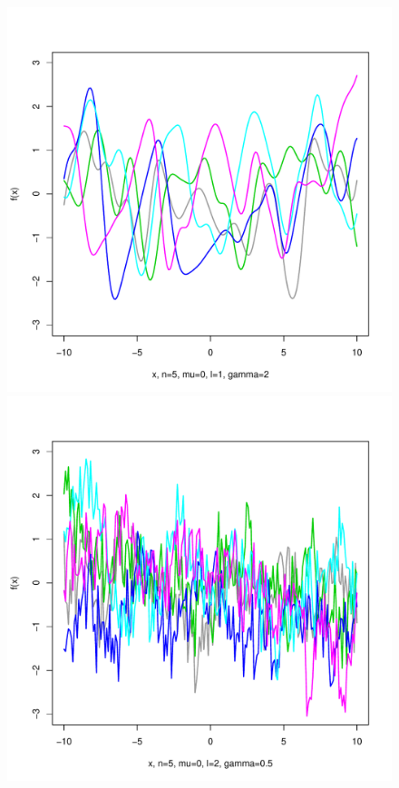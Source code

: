 \documentclass[12pt,letterpaper]{article}
\begin{document}
\begin{figure}
\begin{center}
\includegraphics[scale=0.2]{hw321/n5-m0-l1-g4.pdf}
\includegraphics[scale=0.2]{hw321/n5-m0-l2-g1.pdf}

\end{center}
\end{figure}
\end{document}

